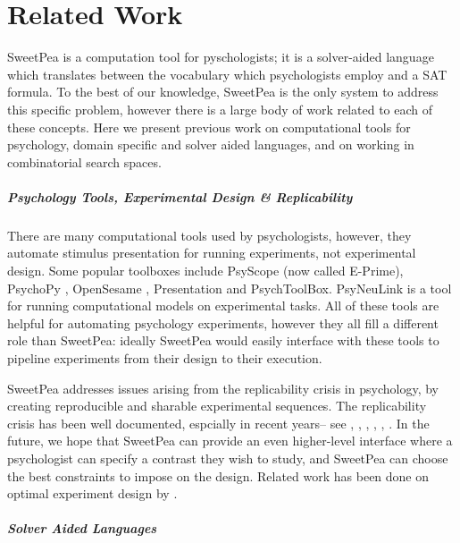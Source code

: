 

\chapter{Related Work}

SweetPea is a computation tool for pyschologists; it is a solver-aided language which translates between the vocabulary which psychologists employ and a SAT formula. To the best of our knowledge, SweetPea is the only system to address this specific problem, however there is a large body of work related to each of these concepts. Here we present previous work on computational tools for psychology, domain specific and solver aided languages, and on working in combinatorial search spaces.

\paragraph*{Psychology Tools, Experimental Design \& Replicability}

There are many computational tools used by psychologists, however, they automate stimulus presentation for running experiments, not experimental design. Some popular toolboxes include PsyScope \cite{cohen1993psyscope} (now called E-Prime), PsychoPy \cite{mathot2012opensesame}, OpenSesame \cite{peirce2009generating}, Presentation and PsychToolBox. PsyNeuLink is a tool for running computational models on experimental tasks. All of these tools are helpful for automating psychology experiments, however they all fill a different role than SweetPea: ideally SweetPea would easily interface with these tools to pipeline experiments from their design to their execution.

SweetPea addresses issues arising from the replicability crisis in psychology, by creating reproducible and sharable experimental sequences. The replicability crisis has been well documented, espcially in recent years-- see  \cite{pashler2012editors}, \cite{pashler2012replicability}, \cite{simons2014value}, \cite{schmidt2016crisis},  \cite{maxwell2015psychology}, \cite{stroebe2016most}.
In the future, we hope that SweetPea can provide an even higher-level interface where a psychologist can specify a contrast they wish to study, and SweetPea can choose the best constraints to impose on the design. Related work has been done on optimal experiment design by \cite{myung2009optimal}.


\paragraph*{Solver Aided Languages}

